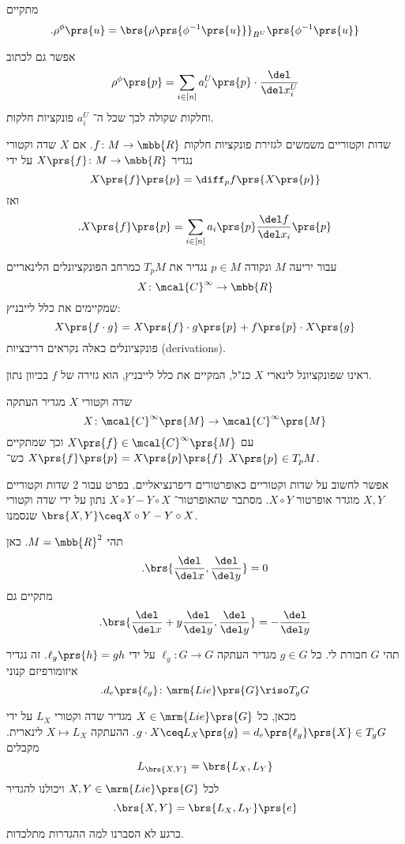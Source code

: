 \documentclass[10pt, twoside]{book}
\newcommand{\textenglish}[1]{\foreignlanguage{english}{#1}}
\newcommand{\Lie}{\mrm{Lie}}
\begin{document}
\begin{remark}
מתקיים
\[\text{.} \rho^\phi\prs{u} = \brs{\rho\prs{\phi^{-1}\prs{u}}}_{B^U}\prs{\phi^{-1}\prs{u}}\]

אפשר גם לכתוב
\[\rho^\phi\prs{p} = \sum_{i \in [n]} a_i^U\prs{p} \cdot \frac{\del}{\del x_i^U}\]
וחלקות שקולה לכך שכל ה־%
$a_i^U$
פונקציות חלקות.
\end{remark}

שדות וקטוריים משמשים לגזירת פונקציות חלקות
$f \colon M \to \mbb{R}$.
אם
$X$
שדה וקטורי נגדיר
$X\prs{f} \colon M \to \mbb{R}$
על ידי
\[X\prs{f}\prs{p} = \diff_p f \prs{X\prs{p}}\]
ואז
\[\text{.} X\prs{f} \prs{p} = \sum_{i \in [n]} a_i\prs{p} \frac{\del f}{\del x_i}\prs{p}\]


\begin{definition}
עבור יריעה
$M$
ונקודה
$p \in M$
נגדיר את
$T_p M$
כמרחב הפונקציונלים הלינאריים
\[X \colon \mcal{C}^\infty \to \mbb{R}\]
שמקיימים את כלל לייבניץ:
\[X\prs{f \cdot g} = X\prs{f} \cdot g\prs{p} + f\prs{p} \cdot X\prs{g}\]
פונקציונלים כאלה נקראים דריבציות \textenglish{(derivations)}.
\end{definition}

\begin{remark}
ראינו שפונקציונל לינארי
$X$
כנ"ל, המקיים את כלל לייבניץ, הוא גזירה של
$f$
בכיוון נתון.
\end{remark}

\begin{remark}
שדה וקטורי
$X$
מגדיר העתקה
\[X \colon \mcal{C}^\infty \prs{M} \to \mcal{C}^\infty \prs{M}\]
עם
$X\prs{f} \in \mcal{C}^\infty\prs{M}$
וכך שמתקיים
$X\prs{f}\prs{p} = X\prs{p}\prs{f}$
כש־%
$X\prs{p} \in T_p M$.

אפשר לחשוב על שדות וקטוריים כאופרטורים דיפרנציאליים.
בפרט עבור 2 שדות וקטוריים
$X,Y$
מוגדר אופרטור
$X \circ Y$.
מסתבר שהאופרטור־%
$X \circ Y - Y \circ X$
נתון על ידי שדה וקטורי שנסמנו
$\brs{X,Y} \ceq X \circ Y - Y \circ X$.
\end{remark}

\begin{example}
תהי
$M = \mbb{R}^2$.
כאן
\[\text{.}\brs{\frac{\del}{\del x}, \frac{\del}{\del y}} = 0\]
מתקיים גם
\[\text{.}\brs{\frac{\del}{\del x} + y \frac{\del}{\del y}, \frac{\del}{\del y}} = - \frac{\del}{\del y}\]
\end{example}

\begin{example}
תהי
$G$
חבורת לי.
כל
$g \in G$
מגדיר העתקה
$\ell_g \colon G \to G$
על ידי
$\ell_g\prs{h} = gh$.
זה נגדיר איזומורפיזם קנוני
\[\text{.} d_e\prs{\ell_g} \colon \Lie\prs{G} \riso T_g G\]

מכאן, כל
$X \in \Lie\prs{G}$
מגדיר שדה וקטורי
$L_X$
על ידי
$g \cdot X \ceq L_X\prs{g} = d_e\prs{\ell_g}\prs{X} \in T_g G$.
ההעתקה
$X \mapsto L_X$
לינארית.
מקבלים
\[L_{\brs{X,Y}} = \brs{L_X, L_Y}\]
לכל
$X,Y \in \Lie\prs{G}$
ויכולנו להגדיר
\[\text{.} \brs{X,Y} = \brs{L_X, L_Y} \prs{e}\]

כרגע לא הסברנו למה ההגדרות מתלכדות.
\end{example}
\end{document}
